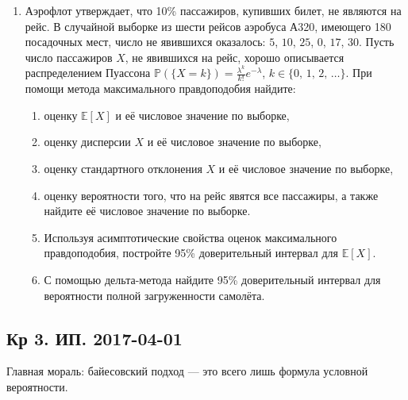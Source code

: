 \documentclass[12pt, a4paper]{article}\usepackage[]{graphicx}\usepackage[]{color}
\begin{document}
\begin{enumerate}
\item
Аэрофлот утверждает, что 10\% пассажиров, купивших билет, не являются на рейс. В случайной выборке из шести рейсов аэробуса А320, имеющего 180 посадочных мест, число не явившихся оказалось: $5$, $10$, $25$, $0$, $17$, $30$. Пусть число пассажиров $X$, не явившихся на рейс, хорошо описывается распределением Пуассона $\mathbb{P}(\{X = k\}) = \tfrac{\lambda^{k}}{k!}e^{-\lambda}$, $k \in \{0,\, 1,\, 2,\, \ldots\}$. При помощи метода максимального правдоподобия найдите:
\begin{enumerate}
  \item оценку $\mathbb{E}[X]$ и её числовое значение по выборке,
  \item оценку дисперсии $X$ и её числовое значение по выборке,
  \item оценку стандартного отклонения $X$ и её числовое значение по выборке,
  \item оценку вероятности того, что на рейс явятся все пассажиры, а также найдите её числовое значение по выборке.
  \item Используя асимптотические свойства оценок максимального правдоподобия, постройте 95\% доверительный интервал для $\mathbb{E}[X]$.
  \item С помощью дельта-метода найдите 95\% доверительный интервал для вероятности полной загруженности самолёта.
\end{enumerate}

\end{enumerate}


\subsection{Кр 3. ИП. 2017-04-01}

Главная мораль: байесовский подход — это всего лишь формула условной вероятности.
\end{document}
